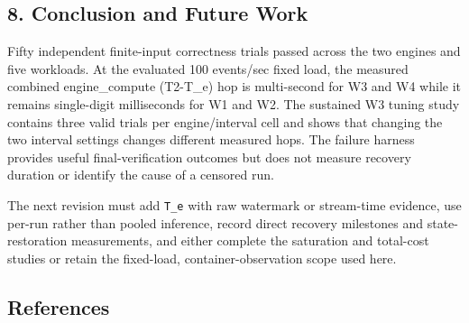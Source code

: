 \documentclass[
]{article}
\begin{document}
\hypertarget{conclusion-and-future-work}{%
\subsection{8. Conclusion and Future
Work}\label{conclusion-and-future-work}}

Fifty independent finite-input correctness trials passed across the two
engines and five workloads. At the evaluated 100 events/sec fixed load,
the measured combined engine_compute (T2-T_e) hop is multi-second for W3 and W4
while it remains single-digit milliseconds for W1 and W2. The sustained
W3 tuning study contains three valid trials per engine/interval cell and
shows that changing the two interval settings changes different measured
hops. The failure harness provides useful final-verification outcomes
but does not measure recovery duration or identify the cause of a
censored run.

The next revision must add \texttt{T\_e} with raw watermark or
stream-time evidence, use per-run rather than pooled inference, record
direct recovery milestones and state-restoration measurements, and
either complete the saturation and total-cost studies or retain the
fixed-load, container-observation scope used here.

\hypertarget{references}{%
\subsection{References}\label{references}}
\end{document}
